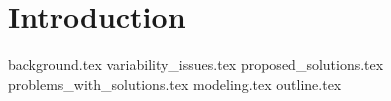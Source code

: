\documentclass[../thesis.tex]{subfiles}
\begin{document}
\begin{comment}
What do I want people to know after reading this?

* Modeling is useful because it allows us to understand the physical causes of VI in great detail. It also lets use explore different scenarios.

* Some basic background about VI, such as a brief history of it and indoor air quality (Radon etc).

* What are the current hot topics in VI?
- ITS
- CPM

* Why is temporal and spatial variability a problem in VI?
\end{comment}

\chapter{Introduction}

{background.tex}
{variability_issues.tex}
{proposed_solutions.tex}
{problems_with_solutions.tex}
{modeling.tex}
{outline.tex}





\begin{comment}




















\end{comment}
\end{document}
